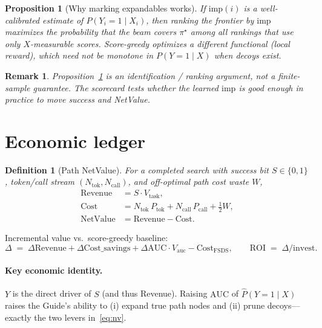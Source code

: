 \documentclass[11pt]{article}
\newtheorem{definition}{Definition}
\newtheorem{proposition}{Proposition}
\newtheorem{remark}{Remark}
\newcommand{\imp}{\mathrm{imp}}
\newcommand{\NV}{\mathrm{NetValue}}
\newcommand{\ROI}{\mathrm{ROI}}
\begin{document}
\begin{proposition}[Why marking expandables works]
\label{prop:why}
If $\imp(i)$ is a well-calibrated estimate of $P(Y_i{=}1\mid X_i)$, then
ranking the frontier by $\imp$ maximizes the probability that the beam
covers $\pi^\star$ among all rankings that use only $X$-measurable scores.
Score-greedy optimizes a different functional (local reward), which need
not be monotone in $P(Y{=}1\mid X)$ when decoys exist.
\end{proposition}

\begin{remark}
Proposition~\ref{prop:why} is an identification / ranking argument, not a
finite-sample guarantee. The scorecard tests whether the learned $\imp$
is good enough in practice to move success and NetValue.
\end{remark}

\section{Economic ledger}
\label{sec:econ}

\begin{definition}[Path NetValue]
For a completed search with success bit $S\in\{0,1\}$, token/call stream
$(N_{\mathrm{tok}},N_{\mathrm{call}})$, and off-optimal path cost waste $W$,
\begin{align}
  \mathrm{Revenue} &= S\cdot V_{\mathrm{task}},\\
  \mathrm{Cost} &= N_{\mathrm{tok}}\,P_{\mathrm{tok}}
                 + N_{\mathrm{call}}\,P_{\mathrm{call}}
                 + \tfrac12 W,\\
  \NV &= \mathrm{Revenue}-\mathrm{Cost}.
  \label{eq:nv}
\end{align}
\end{definition}

Incremental value vs.\ score-greedy baseline:
\begin{equation}
  \Delta
  \;=\;
  \Delta\mathrm{Revenue}
  + \Delta\mathrm{Cost\_savings}
  + \Delta\mathrm{AUC}\cdot V_{\mathrm{auc}}
  - \mathrm{Cost}_{\mathrm{FSDS}},
  \qquad
  \ROI \;=\; \Delta / \mathrm{invest}.
  \label{eq:roi}
\end{equation}

\paragraph{Key economic identity.}
$Y$ is the direct driver of $S$ (and thus Revenue). Raising
$\mathrm{AUC}$ of $\widehat{P}(Y{=}1\mid X)$ raises the Guide's ability to
(i) expand true path nodes and (ii) prune decoys---exactly the two
levers in~\eqref{eq:nv}.
\end{document}
